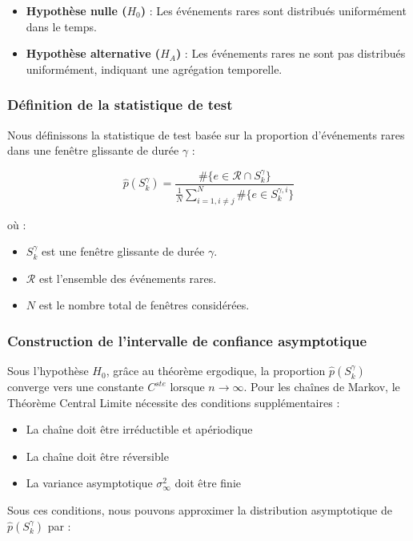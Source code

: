 \documentclass[12pt,a4paper]{article}
\theoremstyle{definition}
\theoremstyle{remark}
\begin{document}
\begin{itemize}
    \item \textbf{Hypothèse nulle ($H_0$)} : Les événements rares sont distribués uniformément dans le temps.
    \item \textbf{Hypothèse alternative ($H_A$)} : Les événements rares ne sont pas distribués uniformément, indiquant une agrégation temporelle.
\end{itemize}

\subsubsection*{Définition de la statistique de test}

Nous définissons la statistique de test basée sur la proportion d'événements rares dans une fenêtre glissante de durée $\gamma$ :

$$
\hat{p}(S_k^{\gamma}) = \frac{\#\{e \in \mathcal{R} \cap S_k^{\gamma}\}}{\frac{1}{N} \sum_{i=1, i \neq j}^N \#\{e \in S_k^{\gamma, i}\}}
$$

où :
\begin{itemize}
    \item $S_k^{\gamma}$ est une fenêtre glissante de durée $\gamma$.
    \item $\mathcal{R}$ est l'ensemble des événements rares.
    \item $N$ est le nombre total de fenêtres considérées.
\end{itemize}

\subsubsection*{Construction de l'intervalle de confiance asymptotique}

Sous l'hypothèse $H_0$, grâce au théorème ergodique, la proportion $\hat{p}(S_k^{\gamma})$ converge vers une constante $C^{ste}$ lorsque $n \to \infty$. Pour les chaînes de Markov, le Théorème Central Limite \cite{jones2005markov} nécessite des conditions supplémentaires :

\begin{itemize}
    \item La chaîne doit être irréductible et apériodique
    \item La chaîne doit être réversible
    \item La variance asymptotique $\sigma^2_{\infty}$ doit être finie
\end{itemize}

Sous ces conditions, nous pouvons approximer la distribution asymptotique de $\hat{p}(S_k^{\gamma})$ par :
\end{document}
